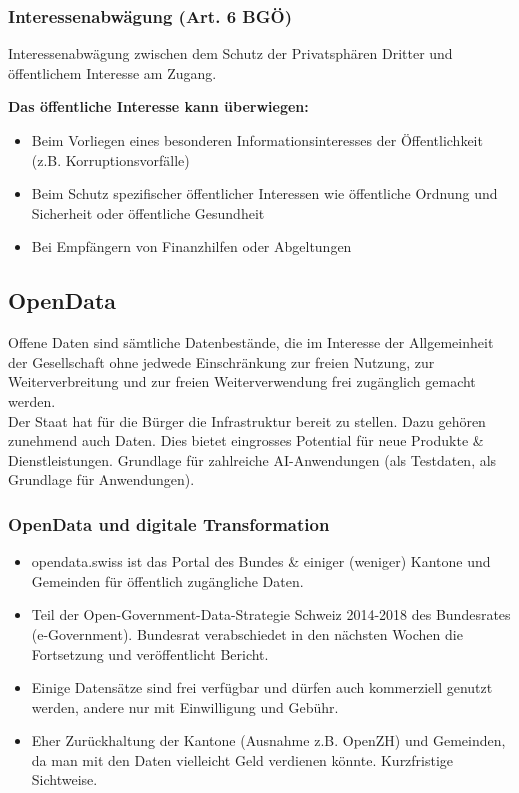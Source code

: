 \subsubsection{Interessenabwägung (Art. 6 BGÖ)}
\label{sec:BGO-Intressenabwaegung}
Interessenabwägung zwischen dem Schutz der Privatsphären Dritter und
öffentlichem Interesse am Zugang.

\textbf{Das öffentliche Interesse kann überwiegen:}
\begin{itemize}
	\tightlist
	\item Beim Vorliegen eines besonderen Informationsinteresses der Öffentlichkeit
	(z.B. Korruptionsvorfälle)
	\item Beim Schutz spezifischer öffentlicher Interessen wie öffentliche Ordnung
	und	Sicherheit oder öffentliche Gesundheit
	\item Bei Empfängern von Finanzhilfen oder Abgeltungen
\end{itemize}

\subsection{OpenData}
Offene Daten sind sämtliche Datenbestände, die im Interesse der Allgemeinheit
der Gesellschaft ohne jedwede Einschränkung zur freien Nutzung, zur
Weiterverbreitung und zur freien Weiterverwendung frei zugänglich gemacht
werden.\\

Der Staat hat für die Bürger die Infrastruktur bereit zu stellen. Dazu
gehören zunehmend auch Daten. Dies bietet eingrosses Potential für neue Produkte
\& Dienstleistungen. Grundlage für zahlreiche AI-Anwendungen (als Testdaten,
als Grundlage für Anwendungen).

\subsubsection{OpenData und digitale Transformation}

\begin{itemize}
	\tightlist
	\item opendata.swiss ist das Portal des Bundes \& einiger (weniger) Kantone und
	Gemeinden für öffentlich zugängliche Daten.
	\item Teil der Open-Government-Data-Strategie Schweiz 2014-2018 des
	Bundesrates (e-Government). Bundesrat verabschiedet in den nächsten
	Wochen die Fortsetzung und veröffentlicht Bericht.
	\item Einige Datensätze sind frei verfügbar und dürfen auch kommerziell genutzt
	werden, andere nur mit Einwilligung und Gebühr.
	\item Eher Zurückhaltung der Kantone (Ausnahme z.B. OpenZH) und Gemeinden, da
	man mit den Daten vielleicht Geld verdienen könnte. Kurzfristige Sichtweise.
\end{itemize}